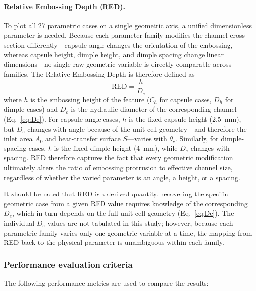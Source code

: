 \documentclass[review,12pt]{elsarticle}
\begin{document}
\paragraph{Relative Embossing Depth (RED).}
To plot all 27 parametric cases on a single geometric axis, a unified dimensionless parameter is needed. Because each parameter family modifies the channel cross-section differently---capsule angle changes the orientation of the embossing, whereas capsule height, dimple height, and dimple spacing change linear dimensions---no single raw geometric variable is directly comparable across families. The Relative Embossing Depth is therefore defined as
\begin{equation}
\text{RED} = \frac{h}{D_e}
\label{eq:red}
\end{equation}
where $h$ is the embossing height of the feature ($C_h$ for capsule cases, $D_h$ for dimple cases) and $D_e$ is the hydraulic diameter of the corresponding channel (Eq.~\eqref{eq:De}). For capsule-angle cases, $h$ is the fixed capsule height (2.5~mm), but $D_e$ changes with angle because of the unit-cell geometry---and therefore the inlet area $A_0$ and heat-transfer surface $S$---varies with $\theta_c$. Similarly, for dimple-spacing cases, $h$ is the fixed dimple height (4~mm), while $D_e$ changes with spacing. RED therefore captures the fact that every geometric modification ultimately alters the ratio of embossing protrusion to effective channel size, regardless of whether the varied parameter is an angle, a height, or a spacing.

It should be noted that RED is a derived quantity: recovering the specific geometric case from a given RED value requires knowledge of the corresponding $D_e$, which in turn depends on the full unit-cell geometry (Eq.~\eqref{eq:De}). The individual $D_e$ values are not tabulated in this study; however, because each parametric family varies only one geometric variable at a time, the mapping from RED back to the physical parameter is unambiguous within each family.

\subsubsection{Performance evaluation criteria}
\label{sec:performance_criteria}

The following performance metrics are used to compare the results:
\end{document}
